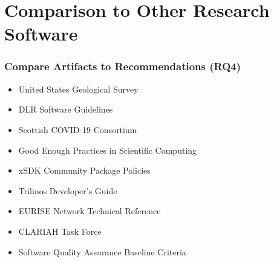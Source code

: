 \documentclass[usenames,dvipsnames]{beamer}
\begin{document}

\section[Comparison]{Comparison to Other Research Software}


\begin{frame}

  \frametitle{Compare Artifacts to Recommendations (RQ4)}

  \begin{itemize}
    \item United States Geological Survey \citep{USGS2019}
    \item DLR Software Guidelines \citep{TobiasEtAl2018}
    \item Scottish COVID-19 Consortium \citep{BrettEtAl2021}
    \item Good Enough Practices in Scientific Computing \citep{WilsonEtAl2016}
    \item xSDK Community Package Policies \citep{SmithAndRoscoe2018}
    \item Trilinos Developer's Guide \citep{HerouxEtAl2008}
    \item EURISE Network Technical Reference \citep{ThielEtAl2020}
    \item CLARIAH Task Force \citep{vanGompelEtAl2016}
    \item Software Quality Assurance Baseline Criteria \citep{OrvizEtAl2017}
  \end{itemize}
  
\end{frame}
  
\end{document}
